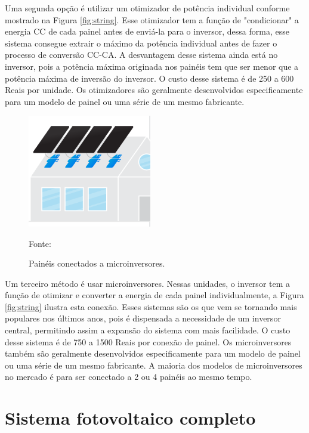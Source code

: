 Uma segunda opção é utilizar um otimizador de potência individual conforme mostrado na Figura \ref{fig:string}. Esse otimizador tem a função de "condicionar" a energia CC de cada painel antes de enviá-la para o inversor, dessa forma, esse sistema consegue extrair o máximo da potência individual antes de fazer o processo de conversão CC-CA. A desvantagem desse sistema ainda está no inversor, pois a potência máxima originada nos painéis tem que ser menor que a potência máxima de inversão do inversor. O custo desse sistema é de 250 a 600 Reais por unidade. Os otimizadores são geralmente desenvolvidos especificamente para um modelo de painel ou uma série de um mesmo fabricante.

\begin{figure}[H]
    \centering
    \includegraphics[width=0.48\textwidth]{./Figuras/micro.png}
    \caption{Painéis conectados a microinversores.}{Fonte: \cite{EnergySage}}
   \label{fig:micro}
\end{figure}

Um terceiro método é usar microinversores. Nessas unidades, o inversor tem a função de otimizar e converter a energia de cada painel individualmente, a Figura \ref{fig:string} ilustra esta conexão. Esses sistemas são os que vem se tornando mais populares nos últimos anos, pois é dispensada a necessidade de um inversor central, permitindo assim a expansão do sistema com mais facilidade. O custo desse sistema é de 750 a 1500 Reais por conexão de painel. Os microinversores também são geralmente desenvolvidos especificamente para um modelo de painel ou uma série de um mesmo fabricante. A maioria dos modelos de microinversores no mercado é para ser conectado a 2 ou 4 painéis ao mesmo tempo.

\section{Sistema fotovoltaico completo}

